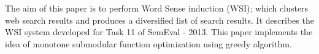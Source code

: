 The aim of this paper is to perform Word Sense induction (WSI); which clusters web search results and produces a diversified list of search results. It
 describes the WSI system developed for Task 11 of SemEval - 2013. This paper
 implements the idea of monotone submodular function optimization using greedy
 algorithm.

